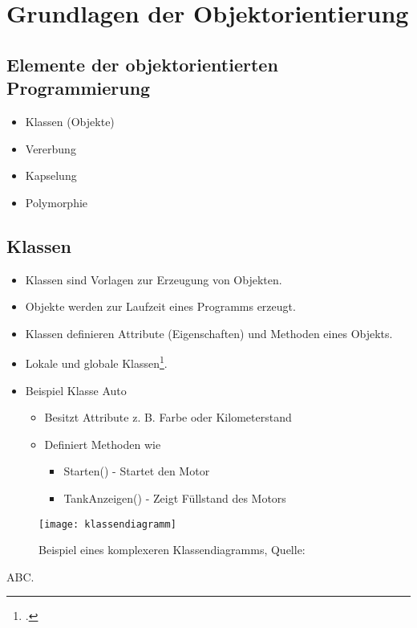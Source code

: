 \section{Grundlagen der Objektorientierung}

\subsection{Elemente der objektorientierten Programmierung}
\begin{itemize}
    \item Klassen (Objekte)
    \item Vererbung
    \item Kapselung
    \item Polymorphie
\end{itemize}

\subsection{Klassen}
\begin{itemize}
    \item Klassen sind Vorlagen zur Erzeugung von Objekten.
    \item Objekte werden zur Laufzeit eines Programms erzeugt.
    \item Klassen definieren Attribute (Eigenschaften) und Methoden eines Objekts.
    \item Lokale und globale Klassen\footcite[Vgl.][S. 4]{zaidiSAPABAPObjects2019}. 
    \item Beispiel Klasse Auto
    \begin{itemize}
        \item Besitzt Attribute z. B. Farbe oder Kilometerstand
        \item Definiert Methoden wie
        \begin{itemize}
            \item Starten() - Startet den Motor
            \item TankAnzeigen() - Zeigt Füllstand des Motors
        \end{itemize}
    \end{itemize}
\end{itemize}

\begin{figure}
    \texttt{[image: klassendiagramm]}
    \caption{Beispiel eines komplexeren Klassendiagramms, Quelle: \textcite{wikipediabenutzerUMLKlassendiagramm}}
    \label{fig:bsp_klassendiagramm}
\end{figure}
ABC.
\newpage